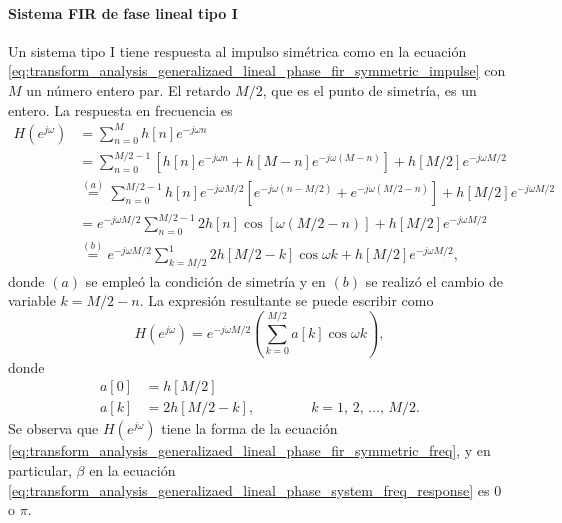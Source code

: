 \documentclass[a4paper]{report}
\begin{document}
\paragraph{Sistema FIR de fase lineal tipo I} Un sistema tipo I tiene respuesta al impulso simétrica
como en la ecuación \ref{eq:transform_analysis_generalizaed_lineal_phase_fir_symmetric_impulse}
con \(M\) un número entero par. El retardo \(M/2\), que es el punto de simetría, es un entero. La respuesta en frecuencia es
\begin{align*}
 H(e^{j\omega})&=\sum_{n=0}^M h[n]e^{-j\omega n}\\
  &=\sum_{n=0}^{M/2-1}\left[h[n]e^{-j\omega n}+h[M-n]e^{-j\omega(M-n)}\right]+h[M/2]e^{-j\omega M/2}\\
  &\overset{(a)}{=}\sum_{n=0}^{M/2-1}h[n]e^{-j\omega M/2}\left[e^{-j\omega(n-M/2)}+e^{-j\omega(M/2-n)}\right]+h[M/2]e^{-j\omega M/2}\\
  &=e^{-j\omega M/2}\sum_{n=0}^{M/2-1}2h[n]\cos[\omega(M/2-n)]+h[M/2]e^{-j\omega M/2}\\
  &\overset{(b)}{=}e^{-j\omega M/2}\sum_{k=M/2}^1 2h[M/2-k]\cos\omega k+h[M/2]e^{-j\omega M/2},
\end{align*}
donde \((a)\) se empleó la condición de simetría y en \((b)\) se realizó el cambio de variable \(k=M/2-n\). La expresión resultante se puede escribir como
\begin{equation}\label{eq:transform_analysis_generalizaed_lineal_phase_fir_type_I_freq_resp}
 H(e^{j\omega})=e^{-j\omega M/2}\left(\sum_{k=0}^{M/2}a[k]\cos\omega k\right), 
\end{equation}
donde
\begin{align*}
 a[0]&=h[M/2]\\
 a[k]&=2h[M/2-k],
 \qquad\qquad 
 k=1,\,2,\,\dots,\,M/2.
\end{align*}
Se observa que \(H(e^{j\omega})\) tiene la forma de la ecuación \ref{eq:transform_analysis_generalizaed_lineal_phase_fir_symmetric_freq}, y en particular, \(\beta\) en la ecuación \ref{eq:transform_analysis_generalizaed_lineal_phase_system_freq_response} es 0 o \(\pi\).
\end{document}

